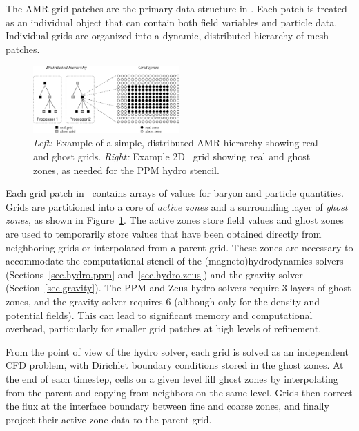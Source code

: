 The AMR grid patches are the primary data structure in \enzo.  Each patch is treated as an individual object that can contain both field variables and particle data.  Individual grids are organized into a  dynamic, distributed hierarchy of mesh patches.  

\begin{figure}
\begin{center}
\includegraphics[width=0.5\textwidth]{figures/amr_hierarchy.eps}
\end{center}
\caption{\emph{Left:} Example of a simple, distributed AMR hierarchy
showing real and ghost grids.  \emph{Right:} Example 2D \enzo\ grid
showing real and ghost zones, as needed for the PPM hydro stencil. }
\label{fig.amr_hierarchy}
\end{figure}

Each grid patch in \enzo\ contains arrays of values for baryon and particle quantities.   Grids are partitioned into a core of \emph{active zones} and a surrounding layer of \emph{ghost zones}, as shown in Figure~\ref{fig.amr_hierarchy}.  The active zones store field values and ghost zones are used to temporarily store values that have been obtained directly from neighboring grids or interpolated from a parent grid.  These zones are necessary to accommodate the computational stencil of the (magneto)hydrodynamics solvers (Sections~\ref{sec.hydro.ppm} and~\ref{sec.hydro.zeus}) and the gravity solver (Section~\ref{sec.gravity}).  The PPM and Zeus hydro solvers require 3 layers of ghost zones,  and the gravity solver requires 6 (although only for the density and potential fields).  This can lead to significant memory and computational overhead, particularly for smaller grid patches at high levels of refinement.  

From the point of view of the hydro solver, each grid is solved as an independent CFD problem, with Dirichlet boundary conditions stored in the ghost zones.  At the end of each timestep, cells on a given level fill ghost zones by interpolating from the parent and copying from neighbors on the same level.  Grids then correct the flux at the interface boundary between fine and coarse zones, and finally project their active zone data to the parent grid. 

